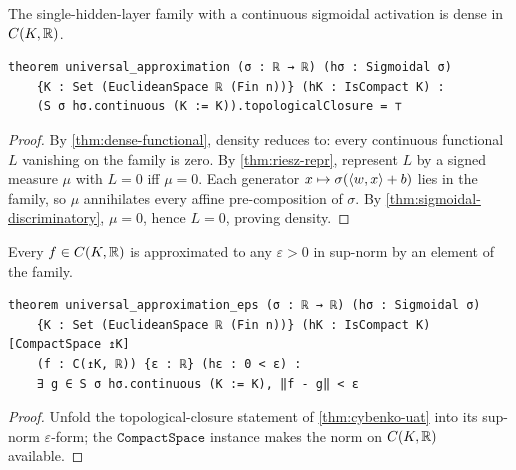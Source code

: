 \begin{theorem}\label{thm:cybenko-uat}
  \leanok
  The single-hidden-layer family with a continuous sigmoidal activation is dense in $C(K,\mathbb{R})$.
\end{theorem}
\begin{verbatim}
theorem universal_approximation (σ : ℝ → ℝ) (hσ : Sigmoidal σ)
    {K : Set (EuclideanSpace ℝ (Fin n))} (hK : IsCompact K) :
    (S σ hσ.continuous (K := K)).topologicalClosure = ⊤
\end{verbatim}
\begin{proof}\leanok
  By \cref{thm:dense-functional}, density reduces to: every continuous functional $L$ vanishing on
  the family is zero. By \cref{thm:riesz-repr}, represent $L$ by a signed measure $\mu$ with $L=0$
  iff $\mu=0$. Each generator $x\mapsto\sigma(\left\langle w, x \right\rangle+b)$ lies in the family, so $\mu$
  annihilates every affine pre-composition of $\sigma$. By \cref{thm:sigmoidal-discriminatory},
  $\mu=0$, hence $L=0$, proving density.
\end{proof}

\begin{corollary}\label{thm:cybenko-eps}
  \leanok
  Every $f\in C(K,\mathbb{R})$ is approximated to any $\varepsilon>0$ in sup-norm by an element of the family.
\end{corollary}
\begin{verbatim}
theorem universal_approximation_eps (σ : ℝ → ℝ) (hσ : Sigmoidal σ)
    {K : Set (EuclideanSpace ℝ (Fin n))} (hK : IsCompact K) [CompactSpace ↥K]
    (f : C(↥K, ℝ)) {ε : ℝ} (hε : 0 < ε) :
    ∃ g ∈ S σ hσ.continuous (K := K), ‖f - g‖ < ε
\end{verbatim}
\begin{proof}\leanok
  Unfold the topological-closure statement of \cref{thm:cybenko-uat} into its sup-norm
  $\varepsilon$-form; the $\mathtt{CompactSpace}$ instance makes the norm on $C(K,\mathbb{R})$ available.
\end{proof}
